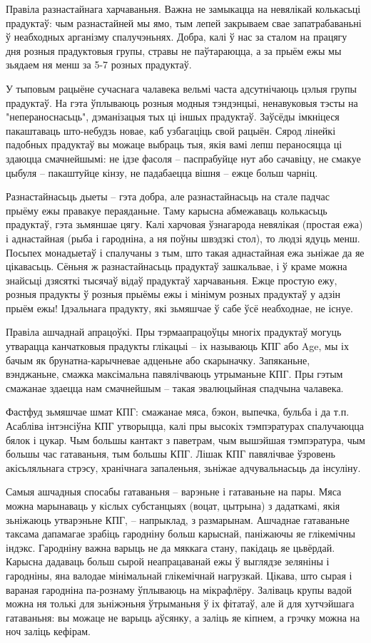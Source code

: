 Правіла разнастайнага харчаваньня. Важна не замыкацца на невялікай колькасьці прадуктаў: чым разнастайней мы ямо, тым лепей закрываем свае запатрабаваньні ў неабходных арганізму спалучэньнях. Добра, калі ў нас за сталом на працягу дня розныя прадуктовыя групы, стравы не паўтараюцца, а за прыём ежы мы зьядаем ня менш за 5-7 розных прадуктаў.

У тыповым рацыёне сучаснага чалавека вельмі часта адсутнічаюць цэлыя групы прадуктаў. На гэта ўплываюць розныя модныя тэндэнцыі, ненавуковыя тэсты на "непераноснасьць", дэманізацыя тых ці іншых прадуктаў. Заўсёды імкніцеся пакаштаваць што-небудзь новае, каб узбагаціць свой рацыён. Сярод лінейкі падобных прадуктаў вы можаце выбраць тыя, якія вамі лепш пераносяцца ці здаюцца смачнейшымі: не ідзе фасоля – паспрабуйце нут або сачавіцу, не смакуе цыбуля – пакаштуйце кінзу, не падабаецца вішня – ежце больш чарніц.

Разнастайнасьць дыеты – гэта добра, але разнастайнасьць на стале падчас прыёму ежы правакуе пераяданьне. Таму карысна абмежаваць колькасьць прадуктаў, гэта зьмяншае цягу. Калі харчовая ўзнагарода невялікая (простая ежа) і аднастайная (рыба і гародніна, а ня поўны швэдзкі стол), то людзі ядуць менш. Посьпех монадыетаў і спалучаны з тым, што такая аднастайная ежа зьніжае да яе цікавасьць. Сёньня ж разнастайнасьць прадуктаў зашкальвае, і ў краме можна знайсьці дзясяткі тысячаў відаў прадуктаў харчаваньня. Ежце простую ежу, розныя прадукты ў розныя прыёмы ежы і мінімум розных прадуктаў у адзін прыём ежы! Ідэальнага прадукту, які зьмяшчае ў сабе ўсё неабходнае, не існуе.

Правіла ашчаднай апрацоўкі. Пры тэрмаапрацоўцы многіх прадуктаў могуць утварацца канчатковыя прадукты глікацыі – іх называюць КПГ або Age, мы іх бачым як брунатна-карычневае адценьне або скарыначку. Запяканьне, вэнджаньне, смажка максімальна павялічваюць утрыманьне КПГ. Пры гэтым смажанае здаецца нам смачнейшым – такая эвалюцыйная спадчына чалавека.

Фастфуд зьмяшчае шмат КПГ: смажанае мяса, бэкон, выпечка, бульба і да т.п. Асабліва інтэнсіўна КПГ утворыцца, калі пры высокіх тэмпэратурах спалучаюцца бялок і цукар. Чым большы кантакт з паветрам, чым вышэйшая тэмпэратура, чым большы час гатаваньня, тым большы КПГ. Лішак КПГ павялічвае ўзровень акісьляльнага стрэсу, хранічнага запаленьня, зьніжае адчувальнасьць да інсуліну.

Самыя ашчадныя спосабы гатаваньня – варэньне і гатаваньне на пары. Мяса можна марынаваць у кіслых субстанцыях (воцат, цытрына) з дадаткамі, якія зьніжаюць утварэньне КПГ, -- напрыклад, з размарынам. Ашчаднае гатаваньне таксама дапамагае зрабіць гародніну больш карыснай, паніжаючы яе глікемічны індэкс. Гародніну важна варыць не да мяккага стану, пакідаць яе цьвёрдай. Карысна дадаваць больш сырой неапрацаванай ежы ў выглядзе зеляніны і гародніны, яна валодае мінімальнай глікемічнай нагрузкай. Цікава, што сырая і вараная гародніна па-рознаму ўплываюць на мікрафлёру. Заліваць крупы вадой можна ня толькі для зьніжэньня ўтрыманьня ў іх фітатаў, але й для хутчэйшага гатаваньня: вы можаце не варыць аўсянку, а заліць яе кіпнем, а грэчку можна на ноч заліць кефірам.

